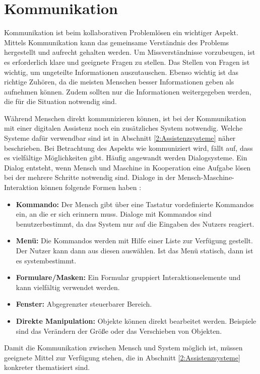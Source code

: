 \section{Kommunikation}
Kommunikation ist beim kollaborativen Problemlösen ein wichtiger Aspekt. Mittels Kommunikation kann das gemeinsame Verständnis des Problems hergestellt und aufrecht gehalten werden. Um Missverständnisse vorzubeugen, ist es erforderlich klare und geeignete Fragen zu stellen. Das Stellen von Fragen ist wichtig, um ungeteilte Informationen auszutauschen. Ebenso wichtig ist das richtige Zuhören, da die meisten Menschen besser Informationen geben als aufnehmen können. Zudem sollten nur die Informationen weitergegeben werden, die für die Situation notwendig sind. \cite{Rohner2016}

Während Menschen direkt kommunizieren können, ist bei der Kommunikation mit einer digitalen Assistenz noch ein zusätzliches System notwendig. Welche Systeme dafür verwendbar sind ist in Abschnitt \ref{2:Assistenzsysteme} näher beschrieben. Bei Betrachtung des Aspekts wie kommuniziert wird, fällt auf, dass es vielfältige Möglichkeiten gibt. Häufig angewandt werden Dialogsysteme. Ein Dialog entsteht, wenn Mensch und Maschine in Kooperation eine Aufgabe lösen bei der mehrere Schritte notwendig sind. Dialoge in der Mensch-Maschine-Interaktion können folgende Formen haben \cite{Heinecke2012}:
\begin{itemize}
\item \textbf{Kommando:} Der Mensch gibt über eine Tastatur vordefinierte Kommandos ein, an die er sich erinnern muss. Dialoge mit Kommandos sind benutzerbestimmt, da das System nur auf die Eingaben des Nutzers reagiert.
\item \textbf{Menü:} Die Kommandos werden mit Hilfe einer Liste zur Verfügung gestellt. Der Nutzer kann dann aus diesen auswählen. Ist das Menü statisch, dann ist es systembestimmt.
\item \textbf{Formulare/Masken:} Ein Formular gruppiert Interaktionselemente und kann vielfältig verwendet werden.
\item \textbf{Fenster:} Abgegrenzter steuerbarer Bereich.
\item \textbf{Direkte Manipulation:} Objekte können direkt bearbeitet werden. Beispiele sind das Verändern der Größe oder das Verschieben von Objekten.
\end{itemize}
Damit die Kommunikation zwischen Mensch und System möglich ist, müssen geeignete Mittel zur Verfügung stehen, die in Abschnitt \ref{2:Assistenzsysteme} konkreter thematisiert sind.

